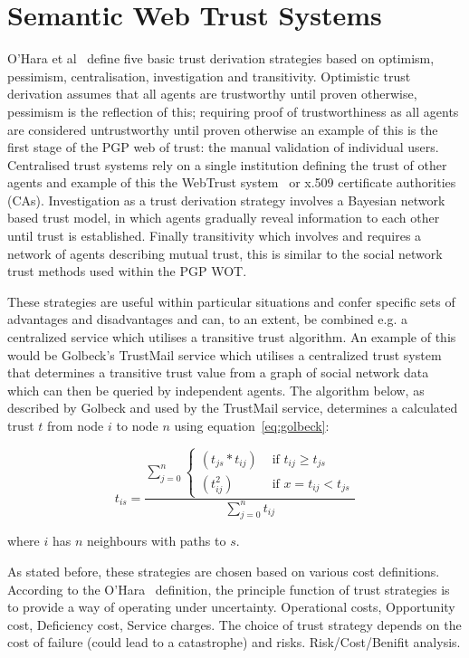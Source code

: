 \documentclass{acm_proc_article-sp}
\begin{document}
\section{Semantic Web Trust Systems}
O'Hara et al~\cite{ohara_trust_2004} define five basic trust derivation strategies based on optimism, pessimism, centralisation, investigation and transitivity.  Optimistic trust derivation assumes that all agents are trustworthy until proven otherwise, pessimism is the reflection of this; requiring proof of trustworthiness as all agents are considered untrustworthy until proven otherwise an example of this is the first stage of the PGP web of trust: the manual validation of individual users.  Centralised trust systems rely on a single institution defining the trust of other agents and example of this the WebTrust system~\cite{golbeck_trust_2003} or x.509 certificate authorities (CAs).  Investigation as a trust derivation strategy involves a Bayesian network based trust model, in which agents gradually reveal information to each other until trust is established.  Finally transitivity which involves and requires a network of agents describing mutual trust, this is similar to the social network trust methods used within the PGP WOT.

These strategies are useful within particular situations and confer specific sets of advantages and disadvantages and can, to an extent, be combined e.g. a centralized service which utilises a transitive trust algorithm.  An example of this would be Golbeck's TrustMail service which utilises a centralized trust system that determines a transitive trust value from a graph of social network data which can then be queried by independent agents.  The algorithm below, as described by Golbeck and used by the TrustMail service, determines a calculated trust $t$ from node $i$ to node $n$ using equation~\ref{eq:golbeck}:

\begin{equation}\label{eq:golbeck}
t_{is}=\frac{\sum_{j=0}^{n}{\begin{cases}
(t_{js}*t_{ij}) & \text{ if } t_{ij} \geq t_{js} \\ 
(t_{ij}^2) & \text{ if } x= t_{ij} < t_{js}
\end{cases}}}{\sum_{j=0}^{n}{t_{ij}}}
\end{equation}

where $i$ has $n$ neighbours with paths to $s$.

As stated before, these strategies are chosen based on various cost definitions.  According to the O'Hara~\cite{ohara_trust_2004} definition, the principle function of trust strategies is to provide a way of operating under uncertainty.   Operational costs, Opportunity cost, Deficiency cost, Service charges. The choice of trust strategy depends on the cost of failure (could lead to a catastrophe) and risks.  Risk/Cost/Benifit analysis.
\end{document}

